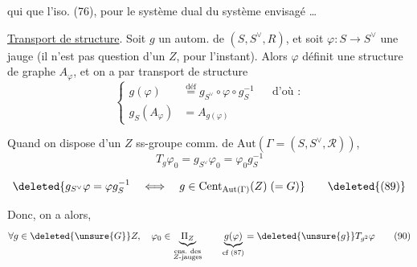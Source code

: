 qui  que l'iso.  (76), pour le système
dual du système envisagé \ldots


\uline{Transport de structure}. Soit $g$ un autom. de
$(S,S^\vee,R)$, et soit $\varphi:S\longrightarrow S^\vee$ une jauge (il n'est
pas question d'un $Z$, pour l'instant). Alors 
$\varphi$ définit une structure de graphe $A_\varphi$, et on
a par transport de structure
\[
\left\{\begin{aligned}
g(\varphi)&\overset{\mathrm{déf}}=g_{S^\vee}\circ\varphi\circ g_S^{-1} &&\text{d'où :}\\
g_S(A_\varphi)&=A_{g(\varphi)}
\end{aligned}\right. \tag*{(87)}
\]

Quand on dispose d'un $Z$ ss-groupe comm. de
$\mathrm{Aut}(\Gamma=(S,S^\vee,\mathcal R))$, 
\[
 T_g\varphi_0=g_{S^\vee}\varphi_0=\varphi_0g_S^{-1} \tag*{(88)}
\]

\[
 \deleted{g_{S^\vee}\varphi=\varphi g_S^{-1}\quad\Longleftrightarrow\quad
 g\in\mathrm{Cent}_{\mathrm{Aut}(\Gamma)}(Z)\;(=G)} \tag*{\deleted{(89)}}
\]

Donc, on a alors, 
\[
 \forall g\in\deleted{\unsure{G}}Z,\quad
 \varphi_0\in\underbrace{\Pi_Z}_{\substack{\text{ens. des}\\ Z\text{-jauges}}}
 \qquad \underbrace{g(\varphi)}_{\text{cf (87)}}=\deleted{\unsure{g}}T_{g^2}\varphi
 \tag*{(90)}
\]

